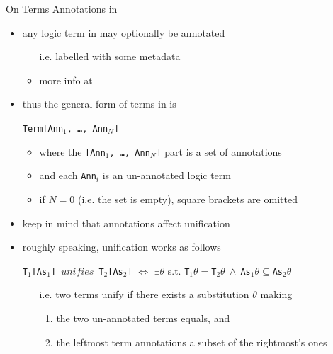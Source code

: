 \documentclass[presentation]{beamer}\mode<presentation>{\usetheme{AMSBolognaFC}}
\begin{document}
\begin{frame}[c]{On Terms Annotations in \jason{}}

\begin{itemize}
    \item any logic term in \jason{} may optionally be \alert{annotated}
    \begin{itemize}
        \item[i.e.] labelled with some metadata
        \item more info at 
    \end{itemize}

    \vfill

    \item thus the general form of terms in \jason{} is
    \begin{center}
        \texttt{Term\alert{[Ann$_1$, \ldots, Ann$_N$]}}
    \end{center}
    \begin{itemize}
        \item where the \texttt{[Ann$_1$, \ldots, Ann$_N$]} part is a \alert{set} of annotations
        \item and each \texttt{Ann$_i$} is an un-annotated logic term
        \item if $N = 0$ (i.e. the set is empty), square brackets are omitted
    \end{itemize}

    \vfill

    \item keep in mind that \alert{annotations affect unification}
    
    \vfill
    
    \item roughly speaking, unification works as follows
    \begin{center}
        \texttt{T$_1$[As$_1$] $unifies$ T$_2$[As$_2$]} $\Leftrightarrow$ $\exists \theta$ s.t. \texttt{T$_1 \theta = $T$_2 \theta\ \wedge\ $As$_1 \theta \subseteq $As$_2 \theta $}
    \end{center}
    \begin{itemize}
        \item[i.e.] two terms unify if there exists a substitution $\theta$ making
        \begin{enumerate}
            \item the two un-annotated terms equals, and 
            \item the leftmost term annotations a subset of the rightmost's ones
        \end{enumerate}
    \end{itemize}
\end{itemize}

\end{frame} 
\end{document}

